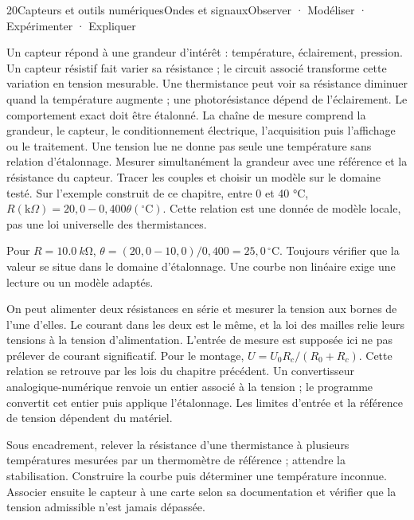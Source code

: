 \begin{ouverture}[mesure]{20}{Capteurs et outils numériques}{Ondes et signaux}{Observer · Modéliser · Expérimenter · Expliquer}
\end{ouverture}
\essentiel
{}
Un capteur répond à une grandeur d'intérêt : température, éclairement, pression. Un capteur résistif fait varier sa résistance ; le circuit associé transforme cette variation en tension mesurable. Une thermistance peut voir sa résistance diminuer quand la température augmente ; une photorésistance dépend de l'éclairement. Le comportement exact doit être étalonné.
La chaîne de mesure comprend la grandeur, le capteur, le conditionnement électrique, l'acquisition puis l'affichage ou le traitement. Une tension lue ne donne pas seule une température sans relation d'étalonnage.
Mesurer simultanément la grandeur avec une référence et la résistance du capteur. Tracer les couples et choisir un modèle sur le domaine testé. Sur l'exemple construit de ce chapitre, entre 0 et 40 °C, $R(\mathrm{k}\Omega)=20,0-0,400\theta(^{\circ}\mathrm C)$. Cette relation est une donnée de modèle locale, pas une loi universelle des thermistances.
\begin{savoirfaire}[Interpolation]Pour $R=\qty{10,0}{k\ohm}$, $\theta=(20,0-10,0)/0,400=25,0\,^{\circ}\mathrm C$. Toujours vérifier que la valeur se situe dans le domaine d'étalonnage. Une courbe non linéaire exige une lecture ou un modèle adaptés.\end{savoirfaire}
On peut alimenter deux résistances en série et mesurer la tension aux bornes de l'une d'elles. Le courant dans les deux est le même, et la loi des mailles relie leurs tensions à la tension d'alimentation. L'entrée de mesure est supposée ici ne pas prélever de courant significatif.
Pour le montage, $U=U_0R_c/(R_0+R_c)$. Cette relation se retrouve par les lois du chapitre précédent. Un convertisseur analogique-numérique renvoie un entier associé à la tension ; le programme convertit cet entier puis applique l'étalonnage. Les limites d'entrée et la référence de tension dépendent du matériel.
\begin{experience}Sous encadrement, relever la résistance d'une thermistance à plusieurs températures mesurées par un thermomètre de référence ; attendre la stabilisation. Construire la courbe puis déterminer une température inconnue. Associer ensuite le capteur à une carte selon sa documentation et vérifier que la tension admissible n'est jamais dépassée.\end{experience}
